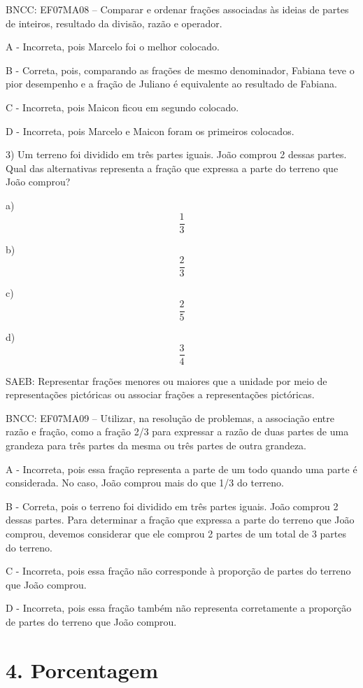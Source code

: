 BNCC: EF07MA08 -- Comparar e ordenar frações associadas às ideias de
partes de inteiros, resultado da divisão, razão e operador.

A - Incorreta, pois Marcelo foi o melhor colocado.

B - Correta, pois, comparando as frações de mesmo denominador, Fabiana
teve o pior desempenho e a fração de Juliano é equivalente ao resultado
de Fabiana.

C - Incorreta, pois Maicon ficou em segundo colocado.

D - Incorreta, pois Marcelo e Maicon foram os primeiros colocados.

3) Um terreno foi dividido em três partes iguais. João comprou 2 dessas
partes. Qual das alternativas representa a fração que expressa a parte
do terreno que João comprou?

a) \[\frac{1}{3}\]

b) \[\frac{2}{3}\]

c) \[\frac{2}{5}\]

d) \[\frac{3}{4}\]

SAEB: Representar frações menores ou maiores que a unidade por meio de
representações pictóricas ou associar frações a representações
pictóricas.

BNCC: EF07MA09 -- Utilizar, na resolução de problemas, a associação
entre razão e fração, como a fração 2/3 para expressar a razão de duas
partes de uma grandeza para três partes da mesma ou três partes de outra
grandeza.

A - Incorreta, pois essa fração representa a parte de um todo quando uma
parte é considerada. No caso, João comprou mais do que 1/3 do terreno.

B - Correta, pois o terreno foi dividido em três partes iguais. João
comprou 2 dessas partes. Para determinar a fração que expressa a parte
do terreno que João comprou, devemos considerar que ele comprou 2 partes
de um total de 3 partes do terreno.

C - Incorreta, pois essa fração não corresponde à proporção de partes do
terreno que João comprou.

D - Incorreta, pois essa fração também não representa corretamente a
proporção de partes do terreno que João comprou.

\hypertarget{porcentagem}{%
\section{4. Porcentagem}\label{porcentagem}}

